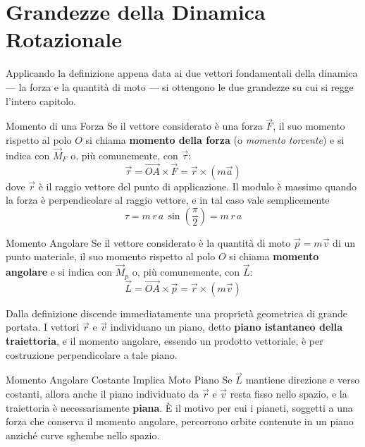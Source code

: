 \section{Grandezze della Dinamica Rotazionale}

Applicando la definizione appena data ai due vettori fondamentali della dinamica --- la forza e la quantità di moto --- si ottengono le due grandezze su cui si regge l'intero capitolo.

\begin{definizione}{Momento di una Forza}
Se il vettore considerato è una forza $\vec{F}$, il suo momento rispetto al polo $O$ si chiama \textbf{momento della forza} (o \emph{momento torcente}) e si indica con $\vec{M}_F$ o, più comunemente, con $\vec{\tau}$:
\begin{equation}
    \vec{\tau} = \vec{OA} \times \vec{F} = \vec{r} \times (m\vec{a})
\end{equation}
dove $\vec{r}$ è il raggio vettore del punto di applicazione. Il modulo è massimo quando la forza è perpendicolare al raggio vettore, e in tal caso vale semplicemente
\begin{equation*}
    \tau = m\,r\,a \, \sin\!\left(\frac{\pi}{2}\right) = m\,r\,a
\end{equation*}
\end{definizione}

\begin{definizione}{Momento Angolare}
Se il vettore considerato è la quantità di moto $\vec{p} = m\vec{v}$ di un punto materiale, il suo momento rispetto al polo $O$ si chiama \textbf{momento angolare} e si indica con $\vec{M}_p$ o, più comunemente, con $\vec{L}$:
\begin{equation}
    \vec{L} = \vec{OA} \times \vec{p} = \vec{r} \times (m\vec{v})
\end{equation}
\end{definizione}

Dalla definizione discende immediatamente una proprietà geometrica di grande portata. I vettori $\vec{r}$ e $\vec{v}$ individuano un piano, detto \textbf{piano istantaneo della traiettoria}, e il momento angolare, essendo un prodotto vettoriale, è per costruzione perpendicolare a tale piano.

\begin{osservazione}{Momento Angolare Costante Implica Moto Piano}
Se $\vec{L}$ mantiene direzione e verso costanti, allora anche il piano individuato da $\vec{r}$ e $\vec{v}$ resta fisso nello spazio, e la traiettoria è necessariamente \textbf{piana}. È il motivo per cui i pianeti, soggetti a una forza che conserva il momento angolare, percorrono orbite contenute in un piano anziché curve sghembe nello spazio.
\end{osservazione}

